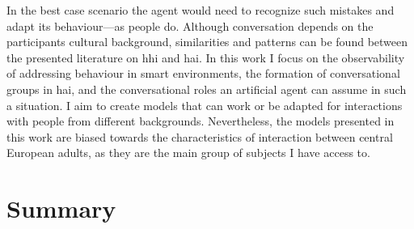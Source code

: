 In the best case scenario the agent would need to recognize such mistakes and adapt its behaviour---as people do.
Although \gls{conversation} depends on the participants cultural background, similarities and patterns can be found between the presented literature on \gls{hhi} and \gls{hai}.
In this work I focus on the observability of addressing behaviour in \glspl{smart environment}, the formation of \glspl{conversational group} in \gls{hai}, and the \glspl{conversational role} an \gls{artificial agent} can assume in such a situation.
I aim to create models that can work or be adapted for interactions with people from different backgrounds.
Nevertheless, the models presented in this work are biased towards the characteristics of interaction between central European adults, as they are the main group of subjects I have access to.

\section{Summary}\label{sec.rw.hi.summary}

